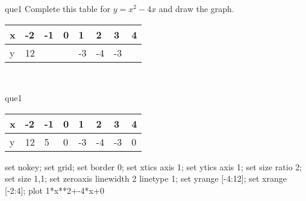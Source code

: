 \documentclass[13.5pt, varwidth=true]{beamer}
\begin{document}
\begin{frame}[shrink=19,fragile]
	\begin{beamercolorbox}[rounded=true, left, shadow=true,wd=14.8cm]{que1}
		 Complete this table for $y = x^{2} - 4x$ and draw the graph. \\[0.3cm] \renewcommand{\arraystretch}{1.2}\begin{tabular}{|C|C|C|C|C|C|C|C|} \hline x & -2 & -1 & 0 & 1 & 2 & 3 & 4 \\ \hline y & 12 &  &  & -3 & -4 & -3 & \\ \hline \end{tabular}\\[0.3cm]
	\end{beamercolorbox}
\end{frame}
\begin{frame}[shrink=19,fragile]
	\begin{beamercolorbox}[rounded=true, left, shadow=true,wd=14.8cm]{que1}
		\renewcommand{\arraystretch}{1.2}\begin{tabular}{|C|C|C|C|C|C|C|C|} \hline x & -2 & -1 & 0 & 1 & 2 & 3 & 4 \\ \hline y & 12 & 5 & 0 & -3 & -4 & -3 & 0\\ \hline \end{tabular}\begin{gnuplot}[terminal=pdf] set nokey; set grid; set border 0; set xtics axis 1; set ytics axis 1; set size ratio 2; set size 1,1; set zeroaxis linewidth 2 linetype 1; set yrange [-4:12]; set xrange [-2:4]; plot 1*x**2+-4*x+0 \end{gnuplot}
	\end{beamercolorbox}
\end{frame}
\end{document}
